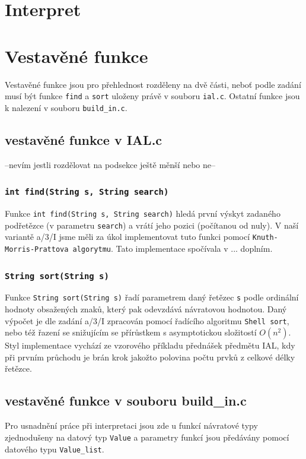 \documentclass[a4paper,11pt]{article}
\begin{document}
\section{Interpret}

\section{Vestavěné funkce}
Vestavěné funkce jsou pro přehlednost rozděleny na dvě části, neboť podle zadání musí být funkce \texttt{find} a \texttt{sort} uloženy právě v souboru \texttt{ial.c}. Ostatní funkce jsou k nalezení v souboru \texttt{build\_in.c}.

\subsection {vestavěné funkce v IAL.c}
--nevím jestli rozdělovat na podsekce ještě měnší nebo ne--

\subsubsection {\texttt{int find(String s, String search)}}
Funkce \texttt{int find(String s, String search)} hledá první výskyt zadaného podřetězce (v parametru \texttt{search}) a vrátí jeho pozici (počítanou od nuly). V naší variantě a/3/I jsme měli za úkol implementovat tuto funkci pomocí \texttt{Knuth-Morris-Prattova algorytmu}. Tato implementace spočívala v ... doplním.

\subsubsection {\texttt{String sort(String s)}}
Funkce \texttt{String sort(String s)} řadí parametrem daný řetězec \texttt{s} podle ordinální hodnoty obsažených znaků, který pak odevzdává návratovou hodnotou. Daný výpočet je dle zadání a/3/I zpracován pomocí řadícího algoritmu \texttt{Shell sort}, nebo též řazení se snižujícím se přírůstkem s asymptotickou složitostí $O(n^{2})$. Styl implementace vychází ze vzorového příkladu přednášek předmětu IAL, kdy při prvním průchodu je brán krok jakožto polovina počtu prvků z celkové délky řetězce.

\subsection {vestavěné funkce v souboru build{\_}in.c}
Pro usnadnění práce při interpretaci jsou zde u funkcí návratové typy zjednodušeny na datový typ \texttt{Value} a parametry funkcí jsou předávány pomocí datového typu \texttt{Value\_list}.
\end{document}

